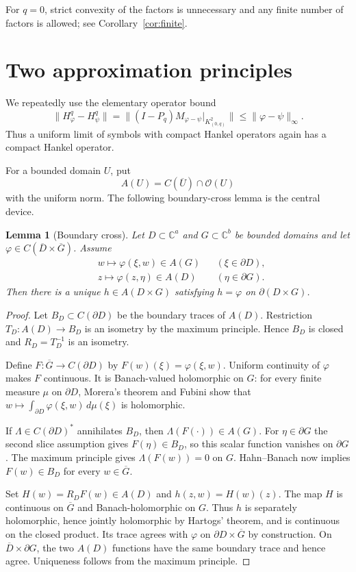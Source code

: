 \documentclass[11pt]{article}
\newtheorem{lemma}{Lemma}
\newcommand{\C}{\mathbb C}
\newcommand{\bd}{\partial}
\newcommand{\cl}[1]{\overline{#1}}
\begin{document}
For $q=0$, strict convexity of the factors is unnecessary and any finite
number of factors is allowed; see Corollary~\ref{cor:finite}.

\section{Two approximation principles}

We repeatedly use the elementary operator bound
\begin{equation}\label{eq:norm}
 \|H_\varphi^q-H_\psi^q\|
 =\|(I-P_q)M_{\varphi-\psi}|_{K^2_{(0,q)}}\|
 \leq\|\varphi-\psi\|_\infty .
\end{equation}
Thus a uniform limit of symbols with compact Hankel operators again has a
compact Hankel operator.

For a bounded domain $U$, put
\[
       A(U)=C(\cl U)\cap\mathcal O(U)
\]
with the uniform norm.  The following boundary-cross lemma is the central
device.

\begin{lemma}[Boundary cross]\label{lem:cross}
Let $D\subset\C^a$ and $G\subset\C^b$ be bounded domains and let
$\varphi\in C(\cl D\times\cl G)$.  Assume
\[
\begin{aligned}
 &w\longmapsto\varphi(\xi,w)\in A(G)
       &&(\xi\in\bd D),\\
 &z\longmapsto\varphi(z,\eta)\in A(D)
       &&(\eta\in\bd G).
\end{aligned}
\]
Then there is a unique $h\in A(D\times G)$ satisfying
$h=\varphi$ on $\bd(D\times G)$.
\end{lemma}

\begin{proof}
Let $B_D\subset C(\bd D)$ be the boundary traces of $A(D)$.  Restriction
$T_D:A(D)\to B_D$ is an isometry by the maximum principle.  Hence $B_D$ is
closed and $R_D=T_D^{-1}$ is an isometry.

Define $F:\cl G\to C(\bd D)$ by
$F(w)(\xi)=\varphi(\xi,w)$.  Uniform continuity of $\varphi$ makes $F$
continuous.  It is Banach-valued holomorphic on $G$: for every finite
measure $\mu$ on $\bd D$, Morera's theorem and Fubini show that
$w\mapsto\int_{\bd D}\varphi(\xi,w)\,d\mu(\xi)$ is holomorphic.

If $\Lambda\in C(\bd D)^*$ annihilates $B_D$, then
$\Lambda(F(\cdot))\in A(G)$.  For $\eta\in\bd G$ the second slice assumption
gives $F(\eta)\in B_D$, so this scalar function vanishes on $\bd G$.
The maximum principle gives $\Lambda(F(w))=0$ on $G$.  Hahn--Banach now
implies $F(w)\in B_D$ for every $w\in\cl G$.

Set $H(w)=R_DF(w)\in A(D)$ and $h(z,w)=H(w)(z)$.  The map $H$ is continuous
on $\cl G$ and Banach-holomorphic on $G$.  Thus $h$ is separately
holomorphic, hence jointly holomorphic by Hartogs' theorem, and is continuous
on the closed product.  Its trace agrees with $\varphi$ on
$\bd D\times\cl G$ by construction.  On $\cl D\times\bd G$, the two
$A(D)$ functions have the same boundary trace and hence agree.  Uniqueness
follows from the maximum principle.
\end{proof}
\end{document}
